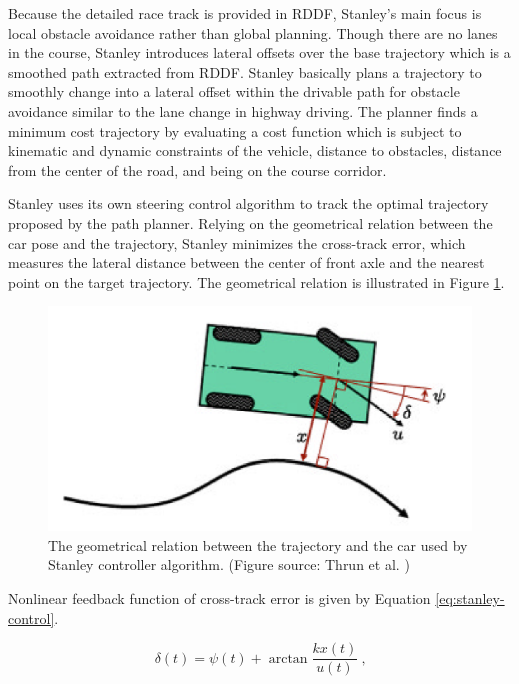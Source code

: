Because the detailed race track is provided in RDDF, Stanley's main focus is
local obstacle avoidance rather than global planning. Though there are no lanes
in the course, Stanley introduces lateral offsets over the base trajectory
which is a smoothed path extracted from RDDF. Stanley basically plans a
trajectory to smoothly change into a lateral offset within the drivable path
for obstacle avoidance similar to the lane change in highway driving. The
planner finds a minimum cost trajectory by evaluating a cost function which is
subject to kinematic and dynamic constraints of the vehicle, distance to
obstacles, distance from the center of the road, and being on the course
corridor.

Stanley uses its own steering control algorithm to track the optimal trajectory
proposed by the path planner. Relying on the geometrical relation between the
car pose and the trajectory, Stanley minimizes the cross-track error, which
measures the lateral distance between the center of front axle and the nearest
point on the target trajectory. The geometrical relation is illustrated in
Figure \ref{figure:stanley-control}.

\begin{figure}[h]
  \centering
  \includegraphics[width=.8\textwidth]{figures/stanley-control.png}
  \caption[Stanley controller algorithm]{The geometrical relation between the
    trajectory and the car used by Stanley controller algorithm. (Figure
    source: Thrun et al. \cite{Thrun2006StanleyTR})}
  \label{figure:stanley-control}
\end{figure}

Nonlinear feedback function of cross-track error is given by Equation
\eqref{eq:stanley-control}.

\begin{equation}
  \delta(t) = \psi(t) + \arctan\frac{kx(t)}{u(t)}\ \textbf{,}
  \label{eq:stanley-control}
\end{equation}

